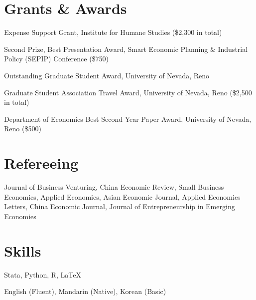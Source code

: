 \documentclass[12pt,letterpaper]{report}
\begin{document}
    \section*{Grants \& Awards}
    \begin{tablist}
    \item[2026, 2025] \tab{}Expense Support Grant, Institute for Humane Studies (\$2,300 in total)
    \item[2025] \tab{}Second Prize, Best Presentation Award, Smart Economic Planning \& Industrial Policy (SEPIP) Conference (\$750)
    \item[2025] \tab{}Outstanding Graduate Student Award, University of Nevada, Reno
    \item[2023] \tab{}Graduate Student Association Travel Award, University of Nevada, Reno (\$2,500 in total)
    \item[2022] \tab{}Department of Economics Best Second Year Paper Award, University of Nevada, Reno (\$500)
    \end{tablist}

    \section*{Refereeing}
\begin{tablist}[leftmargin=0pt,labelwidth=0pt,labelsep=0pt]
  \item[] Journal of Business Venturing, China Economic Review, Small Business Economics, Applied Economics, Asian Economic Journal, Applied Economics Letters, China Economic Journal, Journal of Entrepreneurship in Emerging Economies
\end{tablist}
    

    \section*{Skills}
    \begin{tablist}
        \item[Programming] \tab{}Stata, Python, R, \LaTeX
        \item[Languages] \tab{}English (Fluent), Mandarin (Native), Korean (Basic)
    \end{tablist}
\end{document}
